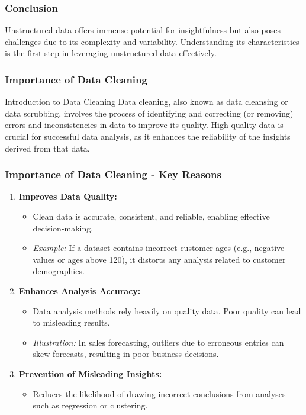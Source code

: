 \documentclass{beamer}
\begin{document}
\begin{frame}[fragile]
    \frametitle{Conclusion}
    Unstructured data offers immense potential for insightfulness but also poses challenges due to its complexity and variability. Understanding its characteristics is the first step in leveraging unstructured data effectively.
\end{frame}

\begin{frame}
    \frametitle{Importance of Data Cleaning}
    \begin{block}{Introduction to Data Cleaning}
        Data cleaning, also known as data cleansing or data scrubbing, involves the process of identifying and correcting (or removing) errors and inconsistencies in data to improve its quality. High-quality data is crucial for successful data analysis, as it enhances the reliability of the insights derived from that data.
    \end{block}
\end{frame}

\begin{frame}
    \frametitle{Importance of Data Cleaning - Key Reasons}
    \begin{enumerate}
        \item \textbf{Improves Data Quality:}
            \begin{itemize}
                \item Clean data is accurate, consistent, and reliable, enabling effective decision-making.
                \item \textit{Example:} If a dataset contains incorrect customer ages (e.g., negative values or ages above 120), it distorts any analysis related to customer demographics.
            \end{itemize}

        \item \textbf{Enhances Analysis Accuracy:}
            \begin{itemize}
                \item Data analysis methods rely heavily on quality data. Poor quality can lead to misleading results.
                \item \textit{Illustration:} In sales forecasting, outliers due to erroneous entries can skew forecasts, resulting in poor business decisions.
            \end{itemize}

        \item \textbf{Prevention of Misleading Insights:}
            \begin{itemize}
                \item Reduces the likelihood of drawing incorrect conclusions from analyses such as regression or clustering.
            \end{itemize}
    \end{enumerate}
\end{frame}
\end{document}
